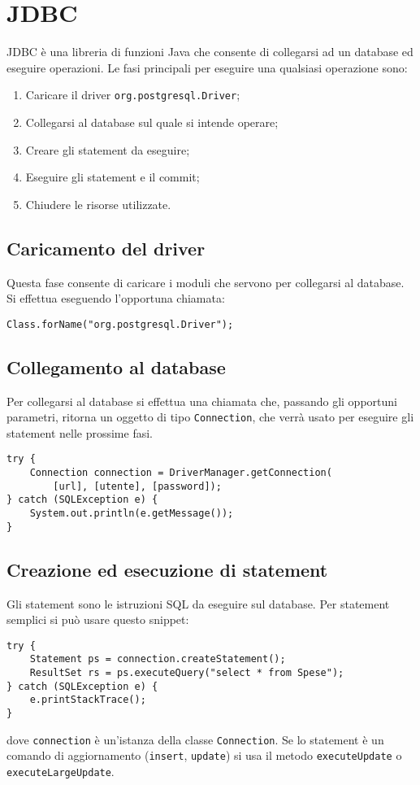 \documentclass[a4paper, 10pt]{article}
\begin{document}
\newpage
\section{JDBC}
JDBC è una libreria di funzioni Java che consente di collegarsi ad un database ed eseguire operazioni.
Le fasi principali per eseguire una qualsiasi operazione sono:

\begin{enumerate}
	\item Caricare il driver \lstinline|org.postgresql.Driver|;
	
	\item Collegarsi al database sul quale si intende operare;
	
	\item Creare gli statement da eseguire;
	
	\item Eseguire gli statement e il commit;
	
	\item Chiudere le risorse utilizzate.
\end{enumerate}

\subsection{Caricamento del driver}
Questa fase consente di caricare i moduli che servono per collegarsi al database. Si effettua eseguendo l'opportuna chiamata:
\lstset{language=Java}
\begin{lstlisting}
Class.forName("org.postgresql.Driver");
\end{lstlisting}

\subsection{Collegamento al database}
Per collegarsi al database si effettua una chiamata che, passando gli opportuni parametri, ritorna un oggetto di tipo \lstinline|Connection|, che verrà usato per eseguire gli statement nelle prossime fasi.

\begin{lstlisting}
try {
	Connection connection = DriverManager.getConnection(
		[url], [utente], [password]);
} catch (SQLException e) {
	System.out.println(e.getMessage());
}
\end{lstlisting}

\subsection{Creazione ed esecuzione di statement}
Gli statement sono le istruzioni SQL da eseguire sul database. Per statement semplici si può usare questo snippet:
\begin{lstlisting}
try {
	Statement ps = connection.createStatement();
	ResultSet rs = ps.executeQuery("select * from Spese");
} catch (SQLException e) {
	e.printStackTrace();
}
\end{lstlisting}
dove \lstinline|connection| è un'istanza della classe \lstinline|Connection|. Se lo statement è un comando di aggiornamento (\lstinline|insert|, \lstinline|update|) si usa il metodo \lstinline|executeUpdate| o \lstinline|executeLargeUpdate|.
\end{document}
